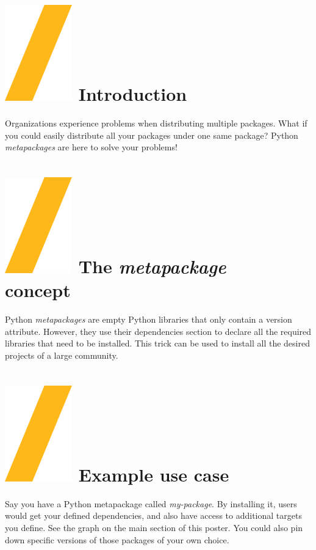\documentclass[a0paper,fleqn]{src/betterposter}
\begin{document}
{\section{\includegraphics[height=\fontcharht\font`\S]{img/general/slash.png} Introduction}
Organizations experience problems when distributing multiple packages. What if you could easily distribute
all your packages under one same package? Python \textit{metapackages} are here to solve your problems!

\section{\includegraphics[height=\fontcharht\font`\S]{img/general/slash.png} The \textit{metapackage}\\concept}
Python \textit{metapackages} are empty Python libraries that only contain a version attribute.
However, they use their dependencies section to declare all the required libraries that need
to be installed. This trick can be used to install all the desired projects of a large community.

\section{\includegraphics[height=\fontcharht\font`\S]{img/general/slash.png} Example use case}
Say you have a Python metapackage called \textit{my-package}. By installing it, users would get your
defined dependencies, and also have access to additional targets you define. See the graph on the main
section of this poster. You could also pin down specific versions of those packages of your own choice.


}
\end{document}
